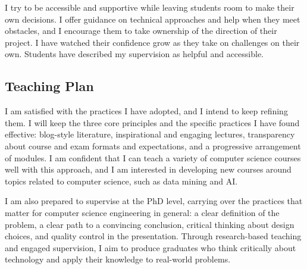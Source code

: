 \vspace{\entryskip}
I try to be accessible and supportive while leaving students room to make their own decisions.
I offer guidance on technical approaches and help when they meet obstacles, and I encourage them to take ownership of the direction of their project. I have watched their confidence grow as they take on challenges on their own.
Students have described my supervision as helpful and accessible.

\subsection*{Teaching Plan}
I am satisfied with the practices I have adopted, and I intend to keep refining them.
I will keep the three core principles and the specific practices I have found effective: blog-style literature, inspirational and engaging lectures, transparency about course and exam formats and expectations, and a progressive arrangement of modules.
I am confident that I can teach a variety of computer science courses well with this approach, and I am interested in developing new courses around topics related to computer science, such as data mining and AI.

\vspace{\entryskip}
I am also prepared to supervise at the PhD level, carrying over the practices that matter for computer science engineering in general: a clear definition of the problem, a clear path to a convincing conclusion, critical thinking about design choices, and quality control in the presentation.
Through research-based teaching and engaged supervision, I aim to produce graduates who think critically about technology and apply their knowledge to real-world problems.
